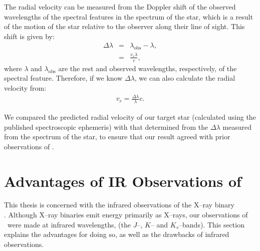 \vspace{\myparskip}

The radial velocity can be measured from the
Doppler shift of the observed wavelengths of the spectral features
in the spectrum of the star, which is a result of the motion of the star relative to the observer along their line of sight. This shift is given by:%
\begin{eqnarray}
\label{cha:InfraredDataReductionTechniques:sec:Spectroscopy:subsec:RadialVelocity:eqn:shift}
\Delta\lambda     & = & \lambda_{\mathrm{obs}} - \lambda,\\
               & = & \frac{v_r \lambda}{c},
\end{eqnarray}
where $\lambda$ and $\lambda_{\mathrm{obs}}$ are the rest and
observed wavelengths, respectively, of the spectral
feature. Therefore, if we know $\Delta\lambda$, we can also calculate the
radial velocity from:%
\begin{eqnarray}
\label{cha:InfraredDataReductionTechniques:sec:Spectroscopy:subsec:RadialVelocity:eqn:vr2}
v_r = \frac{\Delta\lambda}{\lambda} c.
\end{eqnarray}

\vspace{\myparskip}

We compared the predicted radial velocity of our target star
(calculated using the published spectroscopic ephemeris) with that
determined from the $\Delta\lambda$ measured from the spectrum of the star, to ensure that our result agreed with prior observations of \groj. %


\section{Advantages of IR Observations of \groj}
\label{cha:InfraredDataReductionTechniques:sec:InfraredAstronomy}

This thesis is concerned with the infrared observations of the X--ray binary\\%
\groj. Although X--ray binaries emit energy primarily as X--rays, our
observations of \groj\ were made at infrared wavelengths,
(the $J$--, $K$-- and $K_{s}$--bands). This section explains the
advantages for doing so, as well as the drawbacks of infrared
observations. %



